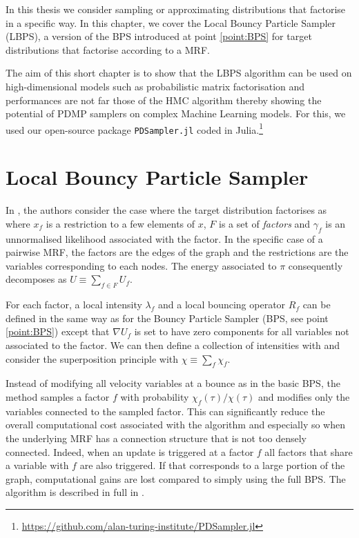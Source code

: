 
In this thesis we consider sampling or approximating distributions that factorise in a specific way. In this chapter, we cover the Local Bouncy Particle Sampler (LBPS), a version of the BPS introduced at point \ref{point:BPS} for target distributions that factorise according to a MRF.

The aim of this short chapter is to show that the LBPS algorithm can be used on high-dimensional models such as probabilistic matrix factorisation and performances are not far those of the HMC algorithm thereby showing the potential of PDMP samplers on complex Machine Learning models. For this, we used our open-source package \texttt{PDSampler.jl} coded in Julia.\footnote{\url{https://github.com/alan-turing-institute/PDSampler.jl}} 

\section{Local Bouncy Particle Sampler}
In \cite{bouchard15}, the authors consider the case where the target distribution factorises as
%
%
where $x_{f}$ is a restriction to a few elements of $x$, $F$ is a set of \emph{factors} and $\gamma_{f}$ is an unnormalised likelihood associated with the factor. In the specific case of a pairwise MRF, the factors are the edges of the graph and the restrictions are the variables corresponding to each nodes. The energy associated to $\pi$ consequently decomposes as $U\equiv \sum_{f\in F}U_{f}$.

For each factor, a local intensity $\lambda_{f}$ and a local bouncing operator $R_{f}$ can be defined in the same way as for the Bouncy Particle Sampler (BPS, see point \ref{point:BPS}) except that $\nabla U_{f}$ is set to have zero components for all variables not associated to the factor. We can then define a collection of intensities with
%
%
and consider the superposition principle with $\chi\equiv\sum_{f} \chi_{f}$.

Instead of modifying all velocity variables at a bounce as in the basic BPS, the method samples a factor $f$ with probability $\chi_{f}(\tau)/\chi(\tau)$ and modifies only the variables connected to the sampled factor. 
This can significantly reduce the overall computational cost associated with the algorithm and especially so when the underlying MRF has a connection structure that is not too densely connected. Indeed, when an update is triggered at a factor $f$ all factors that share a variable with $f$ are also triggered. If that corresponds to a large portion of the graph, computational gains are lost compared to simply using the full BPS. The algorithm is described in full in \citep[chapter 3.3]{bouchard15}.

